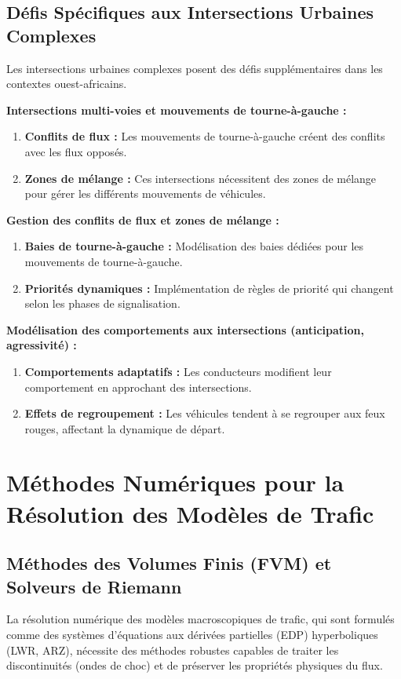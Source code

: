 \subsection{Défis Spécifiques aux Intersections Urbaines Complexes}
Les intersections urbaines complexes posent des défis supplémentaires dans les contextes ouest-africains.

\textbf{Intersections multi-voies et mouvements de tourne-à-gauche :}

\begin{enumerate}
    \item \textbf{Conflits de flux :} Les mouvements de tourne-à-gauche créent des conflits avec les flux opposés.
    \item \textbf{Zones de mélange :} Ces intersections nécessitent des zones de mélange pour gérer les différents mouvements de véhicules.
\end{enumerate}

\textbf{Gestion des conflits de flux et zones de mélange :}

\begin{enumerate}
    \item \textbf{Baies de tourne-à-gauche :} Modélisation des baies dédiées pour les mouvements de tourne-à-gauche.
    \item \textbf{Priorités dynamiques :} Implémentation de règles de priorité qui changent selon les phases de signalisation.
\end{enumerate}

\textbf{Modélisation des comportements aux intersections (anticipation, agressivité) :}

\begin{enumerate}
    \item \textbf{Comportements adaptatifs :} Les conducteurs modifient leur comportement en approchant des intersections.
    \item \textbf{Effets de regroupement :} Les véhicules tendent à se regrouper aux feux rouges, affectant la dynamique de départ.
\end{enumerate}

\section{Méthodes Numériques pour la Résolution des Modèles de Trafic}
\subsection{Méthodes des Volumes Finis (FVM) et Solveurs de Riemann}
La résolution numérique des modèles macroscopiques de trafic, qui sont formulés comme des systèmes d'équations aux dérivées partielles (EDP) hyperboliques (LWR, ARZ), nécessite des méthodes robustes capables de traiter les discontinuités (ondes de choc) et de préserver les propriétés physiques du flux.

